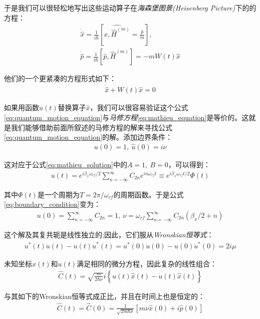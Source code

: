 于是我们可以很轻松地写出这些运动算子在\emph{海森堡图景(Heisenberg Picture)}下的的方程：
\begin{align}
    \dot{\hat{x}}= \frac{1}{i\hbar}\left[\hat{x,\hat{H}^{(m)}}=\frac{\hat{p}}{m}\right],\\
    \dot{\hat{p}}= \frac{1}{i\hbar}\left[\hat{p},\hat{H}^{(m)}\right]=-mW(t)\hat{x}
\end{align}

他们的一个更紧凑的方程形式如下：
\begin{align}
    \ddot{\hat{x}}+W(t)\hat{x}=0 \label{eq:quantum_motion_equation}
\end{align}

如果用函数$u(t)$替换算子$\hat{x}$，我们可以很容易验证这个公式\eqref{eq:quantum_motion_equation}与\emph{马修方程}\eqref{eq:mathieu_equation}是等价的。这就是我们能够借助前面所叙述的马修方程的解来寻找公式\eqref{eq:quantum_motion_equation}的解。添加边界条件：
\begin{align}
    u(0)=1,\ \hat{u}(0)=i\nu \label{eq:boundary_condition}
\end{align}

这对应于公式\eqref{eq:mathieu_solution}中的$A=1,\ B=0$，可以得到：
\begin{align}
    u(t)=e^{i\beta_x\omega_{rf}/2}\sum_{n=-\infty}^{\infty} C_{2n}e^{i n\omega_{rf}t}\equiv e^{i\beta_x\omega_{rf}t/2}\Phi(t) \label{eq:ut_expression}
\end{align}

其中$\Phi(t)$是一个周期为$T=2\pi/\omega_{rf}$的周期函数。于是公式\eqref{eq:boundary_condition}变为：
\begin{align}
    u(0)=\sum_{n=-\infty}^{\infty}C_{2n}=1,\ \nu = \omega_{rf}\sum_{n=-\infty}^{\infty}C_{2n}(\beta_x/2+n)
\end{align}

这个解及其复共轭是线性独立的;因此，它们服从\emph{Wronskian恒等式}：
\begin{align}
    u^*(t)\dot{u}(t)-u(t)\dot{u}^*(t)=u^*(0)\dot{u}(0)-u(0)\dot{u}^*(0)=2 i \mu
\end{align}

未知坐标$\hat{x}(t)$和$u(t)$满足相同的微分方程，因此复杂的线性组合：
\begin{align}
    \hat{C}(t)=\sqrt{\frac{m}{2\hbar \nu}}i\left\{u(t)\dot{\hat{x}(t)-\dot{u}(t)\hat{x}(t)}\right\} \label{eq:complex_combination}
\end{align}

与其如下的Wronskian恒等式成正比，并且在时间上也是恒定的：
\begin{align}
    \hat{C}(t)=\hat{C}(0)=\frac{1}{\sqrt{2m \hbar \nu}}\left[m\nu\hat{x}(0)+i\hat{p}(0)\right]
\end{align}

